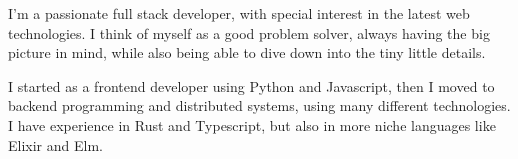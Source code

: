 

\begin{cvparagraph}

I'm a passionate full stack developer, with special interest in the latest web technologies. I think of myself as a good problem solver, always having the big picture in mind, while also being able to dive down into the tiny little details.

I started as a frontend developer using Python and Javascript, then I moved to backend programming and distributed systems, using many different technologies. I have experience in Rust and Typescript, but also in more niche languages like Elixir and Elm.
\end{cvparagraph}
